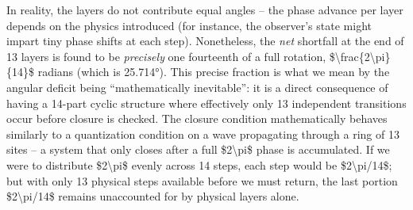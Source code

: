 \documentclass[]{article}
\begin{document}
In reality, the layers do not contribute equal angles -- the phase
advance per layer depends on the physics introduced (for instance, the
observer's state might impart tiny phase shifts at each step​).
Nonetheless, the \emph{net} shortfall at the end of 13 layers is found
to be \emph{precisely} one fourteenth of a full rotation,
\$\textbackslash{}frac\{2\textbackslash{}pi\}\{14\}\$ radians (which is
25.714°). This precise fraction is what we mean by the angular deficit
being ``mathematically inevitable'': it is a direct consequence of
having a 14-part cyclic structure where effectively only 13 independent
transitions occur before closure is checked. The closure condition
mathematically behaves similarly to a quantization condition on a wave
propagating through a ring of 13 sites -- a system that only closes
after a full \$2\textbackslash{}pi\$ phase is accumulated​. If we were
to distribute \$2\textbackslash{}pi\$ evenly across 14 steps, each step
would be \$2\textbackslash{}pi/14\$; but with only 13 physical steps
available before we must return, the last portion
\$2\textbackslash{}pi/14\$ remains unaccounted for by physical layers
alone.
\end{document}
